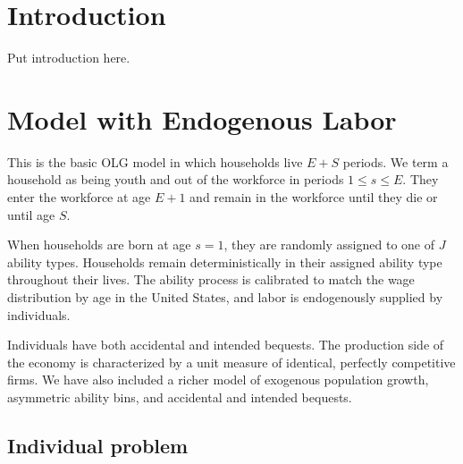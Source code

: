 \documentclass[letterpaper,12pt]{article}
\theoremstyle{definition}
\begin{document}
\begin{spacing}{1.5}

\section{Introduction}\label{SecIntro}

  Put introduction here.


\section{Model with Endogenous Labor}\label{SecModel}

  This is the basic OLG model in which households live $E+S$ periods. We term a household as being youth and out of the workforce in periods $1\leq s\leq E$. They enter the workforce at age $E+1$ and remain in the workforce until they die or until age $S$.

  When households are born at age $s=1$, they are randomly assigned to one of $J$ ability types. Households remain deterministically in their assigned ability type throughout their lives. The ability process is calibrated to match the wage distribution by age in the United States, and labor is endogenously supplied by individuals.

  Individuals have both accidental and intended bequests. The production side of the economy is characterized by a unit measure of identical, perfectly competitive firms. We have also included a richer model of exogenous population growth, asymmetric ability bins, and accidental and intended bequests.


  \subsection{Individual problem}\label{SecIndProb}


\end{spacing}
\end{document}
